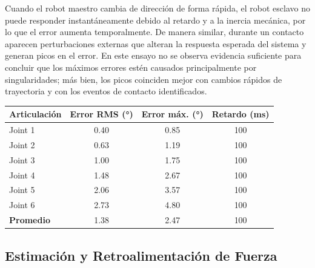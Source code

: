 \documentclass[journal,10pt,twoside]{IEEEtran}
\begin{document}
Cuando el robot maestro cambia de dirección de forma rápida, el robot esclavo no puede responder instantáneamente debido al retardo y a la inercia mecánica, por lo que el error aumenta temporalmente. De manera similar, durante un contacto aparecen perturbaciones externas que alteran la respuesta esperada del sistema y generan picos en el error. En este ensayo no se observa evidencia suficiente para concluir que los máximos errores estén causados principalmente por singularidades; más bien, los picos coinciden mejor con cambios rápidos de trayectoria y con los eventos de contacto identificados.
\begin{center}
\small
\begin{tabular}{lccc}
  \toprule
  \textbf{Articulación} & \textbf{Error RMS (°)} & \textbf{Error máx. (°)} & \textbf{Retardo (ms)} \\
  \midrule
  Joint 1 & 0.40 & 0.85 & 100 \\
  Joint 2 & 0.63 & 1.19 & 100 \\
  Joint 3 & 1.00 & 1.75 & 100 \\
  Joint 4 & 1.48 & 2.67 & 100 \\
  Joint 5 & 2.06 & 3.57 & 100 \\
  Joint 6 & 2.73 & 4.80 & 100 \\
  \midrule
  \textbf{Promedio} & 1.38 & 2.47 & 100 \\
  \bottomrule
\end{tabular}
\end{center}

\subsection{Estimación y Retroalimentación de Fuerza}
\end{document}
